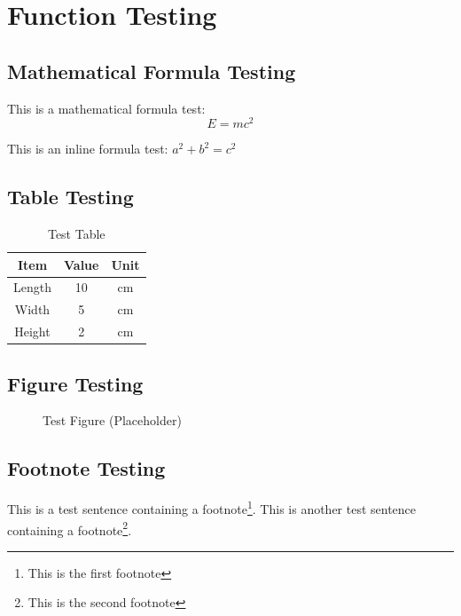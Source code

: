 \chapter{Function Testing}

\section{Mathematical Formula Testing}
This is a mathematical formula test:
\begin{equation}
E = mc^2
\end{equation}

This is an inline formula test: $a^2 + b^2 = c^2$

\section{Table Testing}
\begin{table}[h]
\centering
\caption{Test Table}
\begin{tabular}{|c|c|c|}
\hline
Item & Value & Unit \\
\hline
Length & 10 & cm \\
Width & 5 & cm \\
Height & 2 & cm \\
\hline
\end{tabular}
\end{table}

\section{Figure Testing}
\begin{figure}[h]
\centering
\caption{Test Figure (Placeholder)}
\end{figure}

\section{Footnote Testing}
This is a test sentence containing a footnote\footnote{This is the first footnote}. This is another test sentence containing a footnote\footnote{This is the second footnote}.